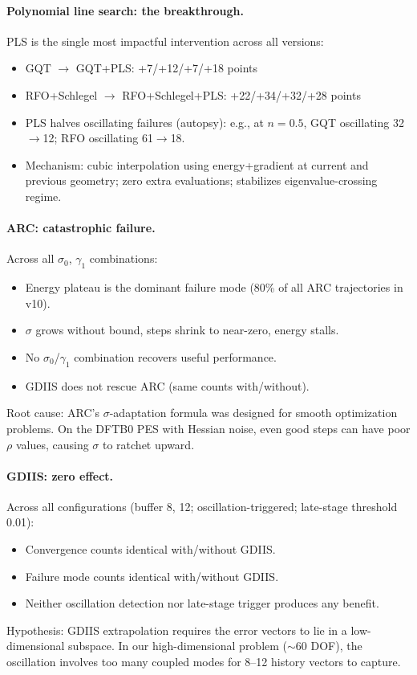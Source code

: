 \documentclass[11pt,a4paper]{article}
\theoremstyle{definition}
\begin{document}
\paragraph{Polynomial line search: the breakthrough.}
PLS is the single most impactful intervention across all versions:
\begin{itemize}[nosep]
  \item GQT $\to$ GQT+PLS: +7/+12/+7/+18 points
  \item RFO+Schlegel $\to$ RFO+Schlegel+PLS: +22/+34/+32/+28 points
  \item PLS halves oscillating failures (autopsy): e.g., at $n=0.5$,
    GQT oscillating 32$\to$12; RFO oscillating 61$\to$18.
  \item Mechanism: cubic interpolation using energy+gradient at current
    and previous geometry; zero extra evaluations; stabilizes
    eigenvalue-crossing regime.
\end{itemize}

\paragraph{ARC: catastrophic failure.}
Across all $\sigma_0$, $\gamma_1$ combinations:
\begin{itemize}[nosep]
  \item Energy plateau is the dominant failure mode (80\% of all ARC
    trajectories in v10).
  \item $\sigma$ grows without bound, steps shrink to near-zero,
    energy stalls.
  \item No $\sigma_0$/$\gamma_1$ combination recovers useful performance.
  \item GDIIS does not rescue ARC (same counts with/without).
\end{itemize}
Root cause: ARC's $\sigma$-adaptation formula was designed for smooth
optimization problems.  On the DFTB0 PES with Hessian noise, even good
steps can have poor $\rho$ values, causing $\sigma$ to ratchet upward.

\paragraph{GDIIS: zero effect.}
Across all configurations (buffer 8, 12; oscillation-triggered;
late-stage threshold 0.01):
\begin{itemize}[nosep]
  \item Convergence counts identical with/without GDIIS.
  \item Failure mode counts identical with/without GDIIS.
  \item Neither oscillation detection nor late-stage trigger produces
    any benefit.
\end{itemize}
Hypothesis: GDIIS extrapolation requires the error vectors to lie in a
low-dimensional subspace.  In our high-dimensional problem ($\sim$60
DOF), the oscillation involves too many coupled modes for 8--12
history vectors to capture.
\end{document}
